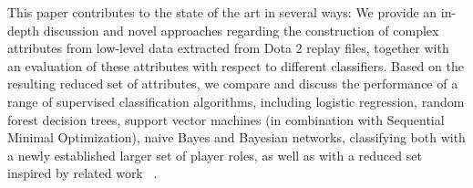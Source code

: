 This paper contributes to the state of the art in several ways: We provide an in-depth discussion and novel approaches regarding the construction of complex attributes from low-level data extracted from Dota 2 replay files, together with an evaluation of these attributes with respect to different classifiers. Based on the resulting reduced set of attributes, we compare and discuss the performance of a range of supervised classification algorithms, including logistic regression, random forest decision trees, support vector machines (in combination with Sequential Minimal Optimization), naive Bayes and Bayesian networks, classifying both with a newly established larger set of player roles, as well as with a reduced set inspired by related work ~\cite{eggert2015classification}.